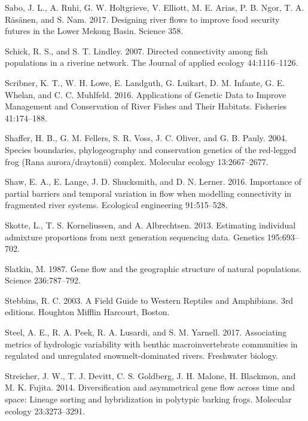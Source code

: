 \documentclass[proquest,12pt,final]{ucthesis-CA2012} %
\begin{document}
\begin{ucmainmatter}
\leavevmode\hypertarget{ref-sabo_designing_2017}{}%
Sabo, J. L., A. Ruhi, G. W. Holtgrieve, V. Elliott, M. E. Arias, P. B.
Ngor, T. A. Räsänen, and S. Nam. 2017. Designing river flows to improve
food security futures in the Lower Mekong Basin. Science 358.

\leavevmode\hypertarget{ref-schick_directed_2007}{}%
Schick, R. S., and S. T. Lindley. 2007. Directed connectivity among fish
populations in a riverine network. The Journal of applied ecology
44:1116--1126.

\leavevmode\hypertarget{ref-scribner_applications_2016}{}%
Scribner, K. T., W. H. Lowe, E. Landguth, G. Luikart, D. M. Infante, G.
E. Whelan, and C. C. Muhlfeld. 2016. Applications of Genetic Data to
Improve Management and Conservation of River Fishes and Their Habitats.
Fisheries 41:174--188.

\leavevmode\hypertarget{ref-shaffer_species_2004}{}%
Shaffer, H. B., G. M. Fellers, S. R. Voss, J. C. Oliver, and G. B.
Pauly. 2004. Species boundaries, phylogeography and conservation
genetics of the red-legged frog (Rana aurora/draytonii) complex.
Molecular ecology 13:2667--2677.

\leavevmode\hypertarget{ref-shaw_importance_2016}{}%
Shaw, E. A., E. Lange, J. D. Shucksmith, and D. N. Lerner. 2016.
Importance of partial barriers and temporal variation in flow when
modelling connectivity in fragmented river systems. Ecological
engineering 91:515--528.

\leavevmode\hypertarget{ref-skotte_estimating_2013}{}%
Skotte, L., T. S. Korneliussen, and A. Albrechtsen. 2013. Estimating
individual admixture proportions from next generation sequencing data.
Genetics 195:693--702.

\leavevmode\hypertarget{ref-slatkin_gene_1987}{}%
Slatkin, M. 1987. Gene flow and the geographic structure of natural
populations. Science 236:787--792.

\leavevmode\hypertarget{ref-stebbins_field_2003}{}%
Stebbins, R. C. 2003. A Field Guide to Western Reptiles and Amphibians.
3rd editions. Houghton Mifflin Harcourt, Boston.

\leavevmode\hypertarget{ref-steel_associating_2017}{}%
Steel, A. E., R. A. Peek, R. A. Lusardi, and S. M. Yarnell. 2017.
Associating metrics of hydrologic variability with benthic
macroinvertebrate communities in regulated and unregulated
snowmelt-dominated rivers. Freshwater biology.

\leavevmode\hypertarget{ref-streicher_diversification_2014}{}%
Streicher, J. W., T. J. Devitt, C. S. Goldberg, J. H. Malone, H.
Blackmon, and M. K. Fujita. 2014. Diversification and asymmetrical gene
flow across time and space: Lineage sorting and hybridization in
polytypic barking frogs. Molecular ecology 23:3273--3291.


\end{ucmainmatter}
\end{document}

